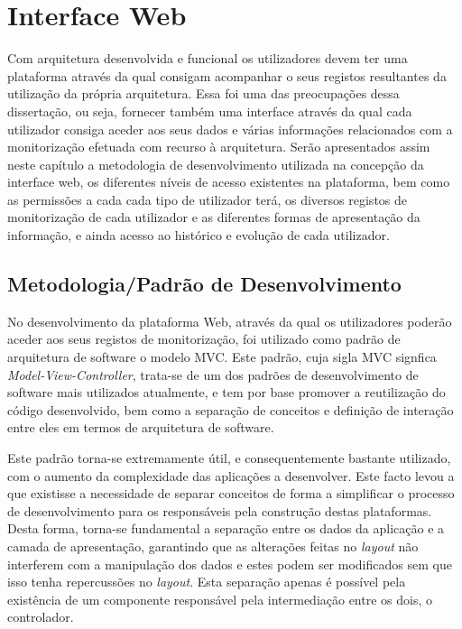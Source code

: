 \chapter{Interface Web}

Com arquitetura desenvolvida e funcional os utilizadores devem ter uma plataforma através da qual consigam acompanhar o seus registos resultantes da utilização da própria arquitetura. Essa foi uma das preocupações dessa dissertação, ou seja, fornecer também uma interface através da qual cada utilizador consiga aceder aos seus dados e várias informações relacionados com a monitorização efetuada com recurso à arquitetura. Serão apresentados assim neste capítulo a metodologia de desenvolvimento utilizada na concepção da interface web, os diferentes níveis de acesso existentes na plataforma, bem como as permissões a cada cada tipo de utilizador terá, os diversos registos de monitorização de cada utilizador e as diferentes formas de apresentação da informação, e ainda acesso ao histórico e evolução de cada utilizador.

\section{Metodologia/Padrão de Desenvolvimento}

No desenvolvimento da plataforma Web, através da qual os utilizadores poderão aceder aos seus registos de monitorização, foi utilizado como padrão de arquitetura de software o modelo MVC. Este padrão, cuja sigla MVC signfica \textit{Model-View-Controller}, trata-se de um dos padrões de desenvolvimento de software mais utilizados atualmente, e tem por base promover a reutilização do código desenvolvido, bem como a separação de conceitos e definição de interação entre eles em termos de arquitetura de software.

Este padrão torna-se extremamente útil, e consequentemente bastante utilizado, com o aumento da complexidade das aplicações a desenvolver. Este facto levou a que existisse a necessidade de separar conceitos de forma a simplificar o processo de desenvolvimento para os responsáveis pela construção destas plataformas. Desta forma, torna-se fundamental a separação entre os dados da aplicação e a camada de apresentação, garantindo que as alterações feitas no \textit{layout} não interferem com a manipulação dos dados e estes podem ser modificados sem que isso tenha repercussões no \textit{layout}. Esta separação apenas é possível pela existência de um componente responsável pela intermediação entre os dois, o controlador.

